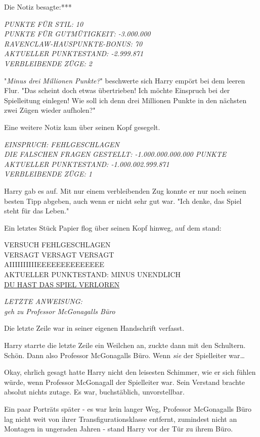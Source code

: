 {Die Notiz besagte:***

\emph{PUNKTE FÜR STIL: 10\\ PUNKTE FÜR GUTMÜTIGKEIT: -3.000.000\\ RAVENCLAW-HAUSPUNKTE-BONUS: 70\\ AKTUELLER PUNKTESTAND: -2.999.871\\ VERBLEIBENDE ZÜGE: 2}

"\emph{Minus drei Millionen Punkte?}" beschwerte sich Harry empört bei dem leeren Flur. "Das scheint doch etwas übertrieben! Ich möchte Einspruch bei der Spielleitung einlegen! Wie soll ich denn drei Millionen Punkte in den nächsten zwei Zügen wieder aufholen?"

Eine weitere Notiz kam über seinen Kopf gesegelt.

\emph{EINSPRUCH: FEHLGESCHLAGEN\\ DIE FALSCHEN FRAGEN} \emph{GESTELLT: -1.000.000.000.000 PUNKTE\\ AKTUELLER PUNKTESTAND: -1.000.002.999.871\\ VERBLEIBENDE ZÜGE: 1}

Harry gab es auf. Mit nur einem verbleibenden Zug konnte er nur noch seinen besten Tipp abgeben, auch wenn er nicht sehr gut war. "Ich denke, das Spiel steht für das Leben."

Ein letztes Stück Papier flog über seinen Kopf hinweg, auf dem stand:

VERSUCH FEHLGESCHLAGEN\\ VERSAGT VERSAGT VERSAGT\\ AIIIIIIIIIIEEEEEEEEEEEEEE\\ AKTUELLER PUNKTESTAND: MINUS UNENDLICH\\ \uline{DU HAST DAS SPIEL VERLOREN}

\emph{LETZTE ANWEISUNG:\\ geh zu Professor McGonagalls Büro}

Die letzte Zeile war in seiner eigenen Handschrift verfasst.

Harry starrte die letzte Zeile ein Weilchen an, zuckte dann mit den Schultern. Schön. Dann also Professor McGonagalls Büro. Wenn \emph{sie} der Spielleiter war…

Okay, ehrlich gesagt hatte Harry nicht den leisesten Schimmer, wie er sich fühlen würde, wenn Professor McGonagall der Spielleiter war. Sein Verstand brachte absolut nichts zutage. Es war, buchstäblich, unvorstellbar.

Ein paar Porträts später - es war kein langer Weg, Professor McGonagalls Büro lag nicht weit von ihrer Transfigurationsklasse entfernt, zumindest nicht an Montagen in ungeraden Jahren - stand Harry vor der Tür zu ihrem Büro.

}
